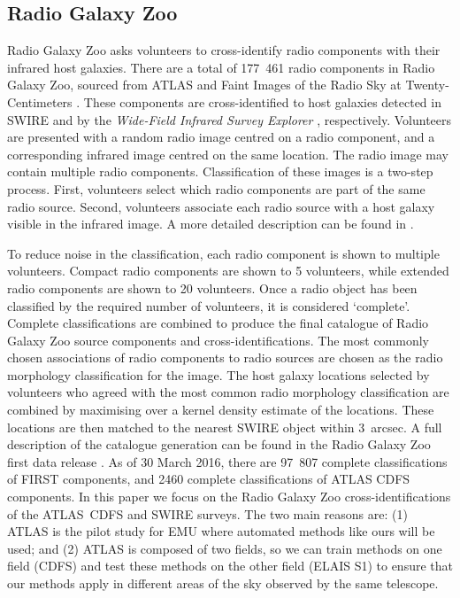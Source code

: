 \documentclass[fleqn,usenatbib,usedcolumn]{mnras}
\begin{document}
  \subsection{Radio Galaxy Zoo}\label{sec:rgz}

    Radio Galaxy Zoo asks volunteers to cross-identify radio components with
    their infrared host galaxies. There are a total of 177~461 radio components
    in Radio Galaxy Zoo, sourced from ATLAS and Faint Images of the Radio Sky at
    Twenty-Centimeters \citep[FIRST;][]{white97first}. These components are
    cross-identified to host galaxies detected in SWIRE and by the
    \emph{Wide-Field Infrared Survey Explorer} \citep[WISE;][]{wright10wise},
    respectively.  Volunteers are presented with a random radio image centred on a radio
    component, and a corresponding infrared image centred on the same
    location. The radio image may contain multiple radio components.
    Classification of these images is a two-step process. First, volunteers
    select which radio components are part of the same radio source. Second,
    volunteers associate each radio source with a host galaxy visible in the
    infrared image. A more detailed description can be found in
    \citet{banfield15}.

    To reduce noise in the classification, each radio component is shown to
    multiple volunteers. Compact radio components are shown to 5 volunteers,
    while extended radio components are shown to 20 volunteers. Once a radio
    object has been classified by the required number of volunteers, it is
    considered `complete'. Complete classifications are combined to produce
    the final catalogue of Radio Galaxy Zoo source components and
    cross-identifications. The most commonly chosen associations of radio
    components to radio sources are chosen as the radio morphology
    classification for the image. The host galaxy locations selected by
    volunteers who agreed with the most common radio morphology classification
    are combined by maximising over a kernel density estimate of the locations.
    These locations are then matched to the nearest SWIRE object within
    3~arcsec. A full description of the catalogue generation can be found in the Radio Galaxy Zoo first data release
    \citep{wong17}. As of 30 March 2016, there are 97~807 complete
    classifications of FIRST components, and 2460 complete classifications of
    ATLAS CDFS components. In this paper we focus on the Radio Galaxy Zoo cross-identifications of
    the ATLAS~CDFS and SWIRE surveys. The two main reasons are: (1) ATLAS is the pilot study for EMU where automated methods
    like ours will be used; and (2) ATLAS is composed of two
    fields, so we can train methods on one field (CDFS) and test these methods on
    the other field (ELAIS S1) to ensure that our methods apply in different areas of
    the sky observed by the same telescope.
\end{document}
